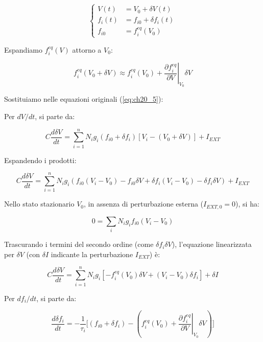\begin{equation} \label{eq:ch20_9}
\begin{cases}
V(t) &= V_0 + \delta V(t) \\ 
f_i(t) &= f_{i0} + \delta f_i(t) \\ 
f_{i0} &= f_i^{eq}(V_0) 
\end{cases}
\end{equation}

Espandiamo $f_i^{eq}(V)$ attorno a $V_0$:

\begin{equation} \label{eq:ch20_10}
f_i^{eq}(V_0 + \delta V) \approx f_i^{eq}(V_0) + \left.\frac{\partial f_i^{eq}}{\partial V}\right|_{V_0} \delta V 
\end{equation}

Sostituiamo nelle equazioni originali (\ref{eq:ch20_5}):

Per $dV/dt$, si parte da:

\begin{equation} \label{eq:ch20_11}
C\frac{d\delta V}{dt} = \sum_{i=1}^{n}N_{i}g_{i}(f_{i0}+\delta f_{i})[V_{i}-(V_{0}+\delta V)]+I_{EXT}
\end{equation}

Espandendo i prodotti:

\begin{equation*}
C\frac{d\delta V}{dt} = \sum_{i=1}^{n}N_{i}g_{i}(f_{i0}(V_i-V_{0}) - f_{i0}\delta V + \delta f_{i}(V_i-V_{0}) - \delta f_{i}\delta V) + I_{EXT}
\end{equation*}

Nello stato stazionario $V_0$, in assenza di perturbazione esterna ($I_{EXT,0}=0$), si ha:

\begin{equation} \label{eq:ch20_12}
0 = \sum_{i}N_{i}g_{i}f_{i0}(V_{i}-V_{0})
\end{equation}

Trascurando i termini del secondo ordine (come $\delta f_i \delta V$), l'equazione linearizzata per $\delta V$ (con $\delta I$ indicante la perturbazione $I_{EXT}$) è:

\begin{equation} \label{eq:ch20_13}
C\frac{d\delta V}{dt} = \sum_{i=1}^{n}N_{i}g_{i}[-f_{i}^{eq}(V_{0})\delta V + (V_{i}-V_{0})\delta f_{i}] + \delta I
\end{equation}

Per $df_i/dt$, si parte da:

\begin{equation} \label{eq:ch20_14}
\frac{d\delta f_{i}}{dt} = -\frac{1}{\tau_{i}}\Bigg[(f_{i0}+\delta f_{i})-\left(f_{i}^{eq}(V_{0})+\left.\frac{\partial f_{i}^{eq}}{\partial V}\right|_{V_{0}}\delta V\right)\Bigg]
\end{equation}


